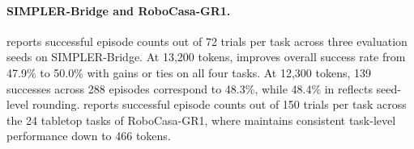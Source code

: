 


\paragraph{SIMPLER-Bridge and RoboCasa-GR1.}
     reports successful episode counts out of 72 trials per task across three evaluation seeds on SIMPLER-Bridge.
    At 13,200 tokens, \method improves overall success rate from 47.9\% to 50.0\% with gains or ties on all four tasks.
    At 12,300 tokens, 139 successes across 288 episodes correspond to 48.3\%, while 48.4\% in  reflects seed-level rounding.
     reports successful episode counts out of 150 trials per task across the 24 tabletop tasks of RoboCasa-GR1, where \method maintains consistent task-level performance down to 466 tokens.